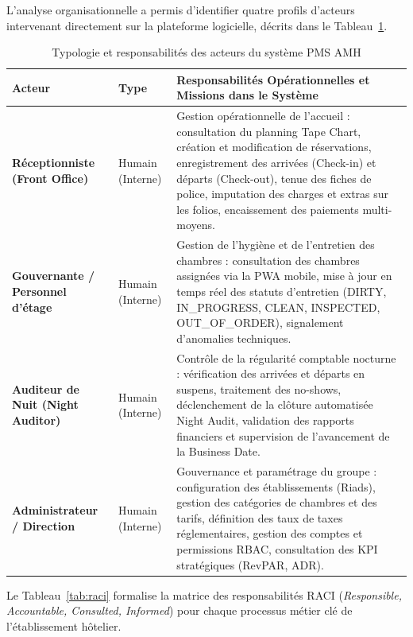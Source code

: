 L'analyse organisationnelle a permis d'identifier quatre profils d'acteurs intervenant directement sur la plateforme logicielle, décrits dans le Tableau~\ref{tab:acteurs_detail}.

\begin{table}[H]
\centering
\small
\renewcommand{\arraystretch}{1.3}
\begin{tabularx}{\textwidth}{|p{3.2cm}|p{2.2cm}|X|}
\hline
\textbf{Acteur} & \textbf{Type} & \textbf{Responsabilités Opérationnelles et Missions dans le Système} \\
\hline
\textbf{Réceptionniste (Front Office)} & Humain (Interne) & Gestion opérationnelle de l'accueil : consultation du planning Tape Chart, création et modification de réservations, enregistrement des arrivées (Check-in) et départs (Check-out), tenue des fiches de police, imputation des charges et extras sur les folios, encaissement des paiements multi-moyens. \\
\hline
\textbf{Gouvernante / Personnel d'étage} & Humain (Interne) & Gestion de l'hygiène et de l'entretien des chambres : consultation des chambres assignées via la PWA mobile, mise à jour en temps réel des statuts d'entretien (DIRTY, IN\_PROGRESS, CLEAN, INSPECTED, OUT\_OF\_ORDER), signalement d'anomalies techniques. \\
\hline
\textbf{Auditeur de Nuit (Night Auditor)} & Humain (Interne) & Contrôle de la régularité comptable nocturne : vérification des arrivées et départs en suspens, traitement des no-shows, déclenchement de la clôture automatisée Night Audit, validation des rapports financiers et supervision de l'avancement de la Business Date. \\
\hline
\textbf{Administrateur / Direction} & Humain (Interne) & Gouvernance et paramétrage du groupe : configuration des établissements (Riads), gestion des catégories de chambres et des tarifs, définition des taux de taxes réglementaires, gestion des comptes et permissions RBAC, consultation des KPI stratégiques (RevPAR, ADR). \\
\hline
\end{tabularx}
\caption{Typologie et responsabilités des acteurs du système PMS AMH}
\label{tab:acteurs_detail}
\end{table}

Le Tableau~\ref{tab:raci} formalise la matrice des responsabilités RACI (\textit{Responsible, Accountable, Consulted, Informed}) pour chaque processus métier clé de l'établissement hôtelier.

